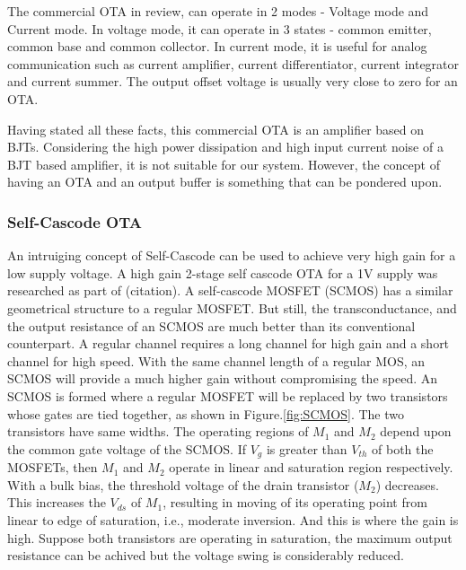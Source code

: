 The commercial OTA in review, can operate in 2 modes - Voltage mode and Current mode. In voltage mode, it can operate in 3 states - common emitter, common base and common collector. In current mode, it is useful for analog communication such as current amplifier, current differentiator, current integrator and current summer. The output offset voltage is usually very close to zero for an OTA.

Having stated all these facts, this commercial OTA is an amplifier based on BJTs. Considering the high power dissipation and high input current noise of a BJT based amplifier, it is not suitable for our system. However, the concept of having an OTA and an output buffer is something that can be pondered upon.

\subsubsection{Self-Cascode OTA}
An intruiging concept of Self-Cascode can be used to achieve very high gain for a low supply voltage. A high gain 2-stage self cascode OTA for a 1V supply was researched as part of (citation). A self-cascode MOSFET (SCMOS) has a similar geometrical structure to a regular MOSFET. But still, the transconductance, and the output resistance of an SCMOS are much better than its conventional counterpart. A regular channel requires a long channel for high gain and a short channel for high speed. With the same channel length of a regular MOS, an SCMOS will provide a much higher gain without compromising the speed. 
An SCMOS is formed where a regular MOSFET will be replaced by two transistors whose gates are tied together, as shown in Figure.\ref{fig:SCMOS}. The two transistors have same widths. The operating regions of $M_1$ and $M_2$ depend upon the common gate voltage of the SCMOS. If $V_g$ is greater than $V_{th}$ of both the MOSFETs, then $M_1$ and $M_2$ operate in linear and saturation region respectively. With a bulk bias, the threshold voltage of the drain transistor ($M_2$) decreases. This increases the $V_{ds}$ of $M_1$, resulting in moving of its operating point from linear to edge of saturation, i.e., moderate inversion. And this is where the gain is high. Suppose both transistors are operating in saturation, the maximum output resistance can be achived but the voltage swing is considerably reduced.

